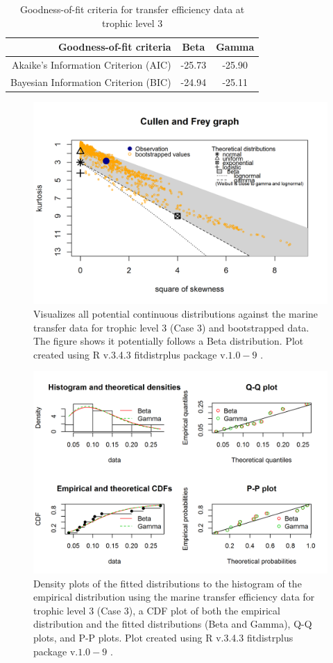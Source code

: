 \documentclass[oneside,12pt,final]{sty/ucthesis-CA2012}
\let\cite\citep                             %
\begin{document}
\begin{mainmatter}
\begin{table}[H]
\centering
\caption{Goodness-of-fit criteria for transfer efficiency data at trophic level 3}
\begin{tabular}{r|c|c}
  \hline \small
 Goodness-of-fit criteria & Beta  & Gamma \\ 
   \hline
   Akaike's Information Criterion (AIC) & -25.73 & -25.90 \\   
   Bayesian Information Criterion (BIC) & -24.94 &  -25.11  \\
   \hline
\end{tabular} 
\label{te3_aic}
\end{table}

\begin{figure}[H]
     \centering
       \includegraphics[width=.8\textwidth]{fig/cullen_frey_te3}
    \caption{Visualizes all potential continuous distributions against the marine transfer data for trophic level 3 (Case 3) and bootstrapped data. The figure shows it potentially follows a Beta distribution. Plot created using R v.3.4.3 \cite{Rcite} fitdistrplus package v.$1.0-9$ \cite{fitdistrplus}. }
    \label{cf_te3}
\end{figure}

\begin{figure}[H]
     \centering
       \includegraphics[width=.8\textwidth]{fig/gof_te3}
    \caption{Density plots of the fitted distributions to the histogram of the empirical distribution using the marine transfer efficiency data for trophic level 3 (Case 3), a CDF plot of both the empirical distribution and the fitted distributions (Beta and Gamma), Q-Q plots, and P-P plots. Plot created using R v.3.4.3 \cite{Rcite} fitdistrplus package v.$1.0-9$ \cite{fitdistrplus}. }
    \label{gof_te3}
\end{figure}


\end{mainmatter}
\end{document}
